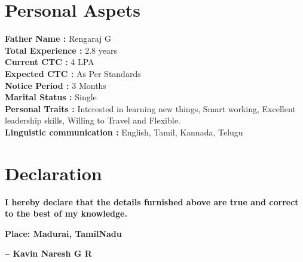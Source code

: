 \documentclass[letterpaper,10pt]{article}
\newcommand{\resumeSubHeadingListStart}{\begin{itemize}[leftmargin=0.15in, label={}]}
\newcommand{\resumeSubHeadingListEnd}{\end{itemize}}
\begin{document}

\section{Personal Aspets}
  \vspace{6pt}
  \resumeSubHeadingListStart
    \small{\item{
        
        \textbf{Father Name :}{ Rengaraj G} \\ \vspace{3pt}
        \textbf{Total Experience :}{ 2.8 years} \\ \vspace{3pt}
        \textbf{Current CTC :}{ 4 LPA} \\ \vspace{3pt}
        \textbf{Expected CTC :}{ As Per Standards } \\ \vspace{3pt}
        \textbf{Notice Period :}{ 3 Months} \\ \vspace{3pt}
        \textbf{Marital Status :}{ Single} \\ \vspace{3pt}
        \textbf{Personal Traits :}{ Interested in learning new things, Smart working, Excellent leadership skills, Willing to Travel and Flexible.} \\ \vspace{3pt}
        \textbf{Linguistic communication :}{ English, Tamil, Kannada, Telugu} \\ \vspace{3pt}
    }}
  \resumeSubHeadingListEnd



\section{Declaration}
  \vspace{6pt}
  
  {\textbf{I hereby declare that the details furnished above are true and correct to the best of my knowledge.}}
  
  \begin{flushleft}
    \textbf{Place: Madurai, TamilNadu}
  \end{flushleft}
  
  \begin{flushright}
    \textbf{-- Kavin Naresh G R}
  \end{flushright}


\end{document}
